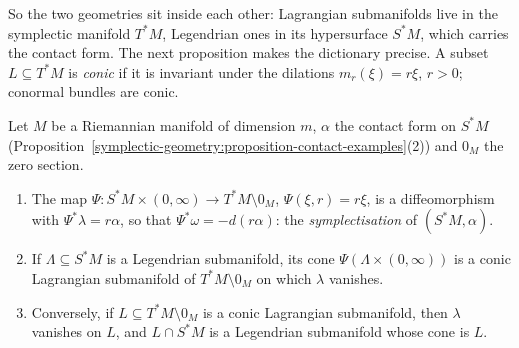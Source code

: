So the two geometries sit inside each other: Lagrangian submanifolds live in the symplectic manifold $T^*M$, Legendrian ones in its hypersurface $S^*M$, which carries the contact form. The next proposition
makes the dictionary precise. A subset $L \subseteq T^*M$ is \emph{conic} if it is invariant under the dilations $m_r(\xi) = r\xi$, $r > 0$; conormal bundles are conic.

\begin{proposition}\label{symplectic-geometry:proposition-symplectization}
Let $M$ be a Riemannian manifold of dimension $m$, $\alpha$ the contact form on $S^*M$ (Proposition~\ref{symplectic-geometry:proposition-contact-examples}(2)) and $0_M$ the zero section.
\begin{enumerate}
\item The map $\Psi \colon S^*M \times (0, \infty) \to T^*M \setminus 0_M$, $\Psi(\xi, r) = r\xi$, is a diffeomorphism with $\Psi^*\lambda = r\alpha$, so that $\Psi^*\omega = -d(r\alpha)$: the \emph{symplectisation} of $(S^*M, \alpha)$.
\item If $\Lambda \subseteq S^*M$ is a Legendrian submanifold, its cone $\Psi(\Lambda \times (0, \infty))$ is a conic Lagrangian submanifold of $T^*M \setminus 0_M$ on which $\lambda$ vanishes.
\item Conversely, if $L \subseteq T^*M \setminus 0_M$ is a conic Lagrangian submanifold, then $\lambda$ vanishes on $L$, and $L \cap S^*M$ is a Legendrian submanifold whose cone is $L$.
\end{enumerate}
\end{proposition}


